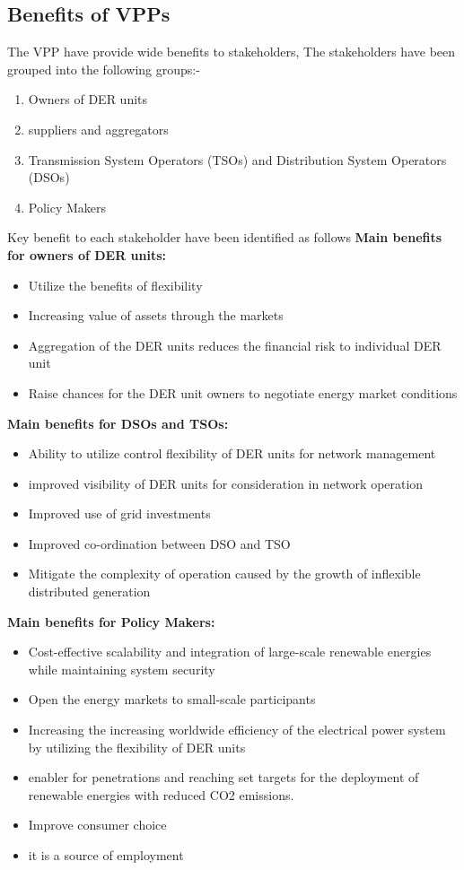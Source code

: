 \documentclass[nonacm,sigconf,12pt]{acmart}
\begin{document}
\subsection*{Benefits of VPPs}
The VPP have provide wide benefits to stakeholders, The stakeholders have been grouped into the following groups:-
\begin{enumerate}
    \item Owners of DER units
    \item suppliers and aggregators
    \item Transmission System Operators (TSOs) and Distribution System Operators (DSOs)
    \item Policy Makers
    
\end{enumerate}
Key benefit to each stakeholder have been identified as follows \cite{Braun2009} \newline
\textbf{Main benefits for owners of DER units:}
\begin{itemize}
    \item Utilize the benefits of flexibility 
    \item Increasing value of assets through the markets
    \item Aggregation of the DER units reduces the financial risk to individual  DER unit
    \item Raise chances for the DER unit owners to negotiate energy market conditions 
    
\end{itemize}

\textbf{Main benefits for DSOs and TSOs: }
\begin{itemize}
    \item Ability to utilize control flexibility of DER units for network management
    \item improved visibility of DER units for consideration in network operation 
    \item Improved use of grid investments 
    \item Improved co-ordination between DSO and TSO
    \item Mitigate the complexity of operation caused by the growth of inflexible distributed generation 
\end{itemize}

\textbf{Main benefits for Policy Makers:} 
\begin{itemize}
    \item Cost-effective  scalability  and integration of large-scale renewable energies while maintaining system security 
    \item Open the energy markets to small-scale participants
    \item Increasing the increasing worldwide  efficiency of the electrical power system by utilizing the  flexibility of DER units
    \item enabler for penetrations and reaching set targets for the deployment of renewable energies with reduced CO2 emissions.
    \item Improve consumer choice 
    \item it is a source of employment 
    
\end{itemize}
\end{document}
